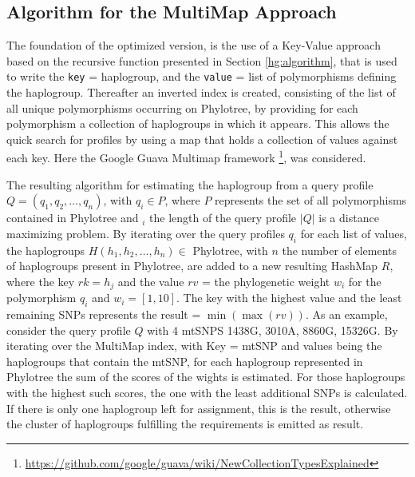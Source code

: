 \subsection{Algorithm for the MultiMap Approach}
The foundation of the optimized version, is the use of a Key-Value approach based on the recursive function presented in Section \ref{hg:algorithm}, that is used to write the \texttt{key} = haplogroup, and the \texttt{value} = list of polymorphisms defining the haplogroup. Thereafter an inverted index is created, consisting of the list of all unique polymorphisms occurring on Phylotree, by providing for each polymorphism a collection of haplogroups in which it appears. This allows the quick search for profiles by using a map that holds a collection of values against each key. Here the Google Guava Multimap framework \footnote{\url{https://github.com/google/guava/wiki/NewCollectionTypesExplained}}, was considered.

The resulting algorithm for estimating the haplogroup from a query profile $Q  = \left(q_1,q_2,\dotsc,q_n\right)$, with $q_i \in P$, where $P$ represents the set of all polymorphisms contained in Phylotree and $_i$ the length of the query profile $|Q|$ is a distance maximizing problem. By iterating over the query profiles $q_i$ for each list of values, the haplogroups $H \left(h_1,h_2,\dotsc,h_n\right) \in$ Phylotree, with $n$ the number of elements of haplogroups present in Phylotree, are added to a new resulting HashMap $R$, where the key $rk = h_j$ and the value $rv$ = the phylogenetic weight $w_i$ for the polymorphism $q_i$ and $w_i = \left[1, 10\right]$. The key with the highest value and the least remaining SNPs represents the result = $ \min\left(\max\left(rv\right)\right)$. 
As an example, consider the query profile $Q$ with 4 mtSNPS  1438G, 3010A, 8860G, 15326G. By iterating over the MultiMap index, with Key = mtSNP and values being the haplogroups that contain the mtSNP, for each haplogroup represented in Phylotree the sum of the scores of the wights is estimated. For those haplogroups with the highest such scores, the one with the least additional SNPs is calculated. If there is only one haplogroup left for assignment, this is the result, otherwise the cluster of haplogroups fulfilling the requirements is emitted as result.

